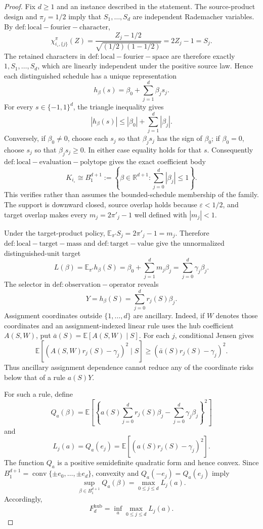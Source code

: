 \documentclass{article}
\begin{document}
\begin{proof}
Fix \(d\geq1\) and an instance described in the statement.  The source-product design and \(\pi_j=1/2\) imply that \(S_1,\ldots,S_d\) are independent Rademacher variables.  By \(\mathrm{def:local-fourier-character}\),
\[
 \chi_{i_{\circ},\{j\}}^{\pi}(Z)
 =\frac{Z_j-1/2}{\sqrt{(1/2)(1-1/2)}}=2Z_j-1=S_j.
\]
The retained characters in \(\mathrm{def:local-fourier-space}\) are therefore exactly \(1,S_1,\ldots,S_d\), which are linearly independent under the positive source law.  Hence each distinguished schedule has a unique representation
\[
 h_{\beta}(s)=\beta_0+\sum_{j=1}^d\beta_js_j.
\]
For every \(s\in\{-1,1\}^d\), the triangle inequality gives
\[
 |h_{\beta}(s)|\leq |\beta_0|+\sum_{j=1}^d|\beta_j|.
\]
Conversely, if \(\beta_0\neq0\), choose each \(s_j\) so that \(\beta_js_j\) has the sign of \(\beta_0\); if \(\beta_0=0\), choose \(s_j\) so that \(\beta_js_j\geq0\).  In either case equality holds for that \(s\).  Consequently \(\mathrm{def:local-evaluation-polytope}\) gives the exact coefficient body
\[
 K_{i_{\circ}}
 \cong B_1^{d+1}
 :=\left\{\beta\in\mathbb R^{d+1}:\sum_{j=0}^d|\beta_j|\leq1\right\}.
\]
This verifies rather than assumes the bounded-schedule membership of the family.  The support is downward closed, source overlap holds because \(\varepsilon<1/2\), and target overlap makes every \(m_j=2\pi'_j-1\) well defined with \(|m_j|<1\).

Under the target-product policy, \(\mathbb E_{\pi'}S_j=2\pi'_j-1=m_j\).  Therefore \(\mathrm{def:local-target-mass}\) and \(\mathrm{def:target-value}\) give the unnormalized distinguished-unit target
\[
 L(\beta)=\mathbb E_{\pi'}h_{\beta}(S)
 =\beta_0+\sum_{j=1}^dm_j\beta_j
 =\sum_{j=0}^d\gamma_j\beta_j.
\]
The selector in \(\mathrm{def:observation-operator}\) reveals
\[
 Y=h_{\beta}(S)=\sum_{j=0}^dr_j(S)\beta_j.
\]
Assignment coordinates outside \(\{1,\ldots,d\}\) are ancillary.  Indeed, if \(W\) denotes those coordinates and an assignment-indexed linear rule uses the hub coefficient \(A(S,W)\), put \(\bar a(S)=\mathbb E[A(S,W)\mid S]\).  For each \(j\), conditional Jensen gives
\[
 \mathbb E\!\left[(A(S,W)r_j(S)-\gamma_j)^2\mid S\right]
 \geq (\bar a(S)r_j(S)-\gamma_j)^2.
\]
Thus ancillary assignment dependence cannot reduce any of the coordinate risks below that of a rule \(a(S)Y\).

For such a rule, define
\[
 Q_a(\beta)=\mathbb E\left[
 \left\{a(S)\sum_{j=0}^dr_j(S)\beta_j-
             \sum_{j=0}^d\gamma_j\beta_j\right\}^2
 \right]
\]
and
\[
 L_j(a)=Q_a(e_j)=\mathbb E[(a(S)r_j(S)-\gamma_j)^2].
\]
The function \(Q_a\) is a positive semidefinite quadratic form and hence convex.  Since
\(
B_1^{d+1}=\operatorname{conv}\{\pm e_0,\ldots,\pm e_d\}
\), convexity and \(Q_a(-e_j)=Q_a(e_j)\) imply
\[
 \sup_{\beta\in B_1^{d+1}}Q_a(\beta)=\max_{0\leq j\leq d}L_j(a).
\]
Accordingly,
\[
 F_d^{\mathrm{hub}}=\inf_a\max_{0\leq j\leq d}L_j(a).
\]


\end{proof}
\end{document}
